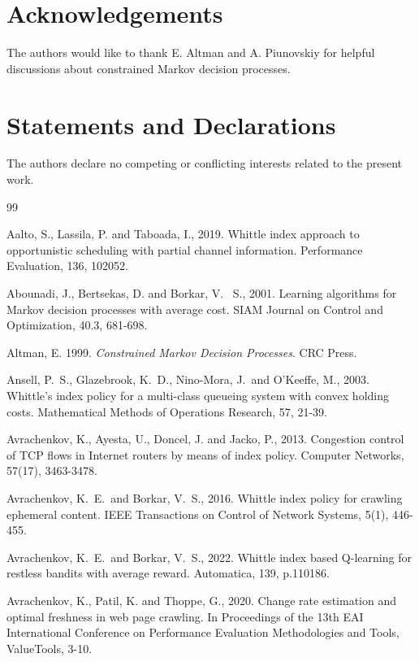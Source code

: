 \documentclass[12pt]{article}
\numberwithin{equation}{section}
\newcommand{\1}{\textbf{1}}
\begin{document}
\section*{Acknowledgements} The authors would like to thank E. Altman and A. Piunovskiy
for helpful discussions about constrained Markov decision processes.

\section*{Statements and Declarations} The authors declare no competing or conflicting interests related to the present work.


\begin{thebibliography}{99}

 Aalto, S., Lassila, P. and Taboada, I., 2019. Whittle index approach to opportunistic scheduling with partial channel information. Performance Evaluation, 136, 102052.

 Abounadi, J., Bertsekas, D. and Borkar, V. \ S., 2001. 
Learning algorithms for Markov decision processes with average cost. 
SIAM Journal on Control and Optimization, 40.3, 681-698.

 Altman, E. 1999. {\it Constrained Markov Decision Processes}. CRC Press.

 Ansell, P.\ S., Glazebrook, K.\ D., Nino-Mora, J.\ and O'Keeffe, M., 2003. Whittle's index policy for a multi-class queueing system with convex holding costs. Mathematical Methods of Operations Research, 57, 21-39.
    
 Avrachenkov, K., Ayesta, U., Doncel, J. and Jacko, P., 2013. 
Congestion control of TCP flows in Internet routers by means of index policy. Computer Networks, 57(17), 3463-3478.    

 Avrachenkov, K.\ E.\ and Borkar, V.\ S., 2016. Whittle index policy for crawling ephemeral content. IEEE Transactions on Control of Network Systems, 5(1), 446-455.

 Avrachenkov, K.\ E.\ and Borkar, V.\ S., 2022. Whittle index based Q-learning for restless bandits with average reward. Automatica, 139, p.110186.

 Avrachenkov, K., Patil, K. and Thoppe, G., 2020. 
Change rate estimation and optimal freshness in web page crawling. 
In Proceedings of the 13th EAI International Conference on Performance Evaluation Methodologies and Tools, ValueTools, 3-10.


\end{thebibliography}
\end{document}
